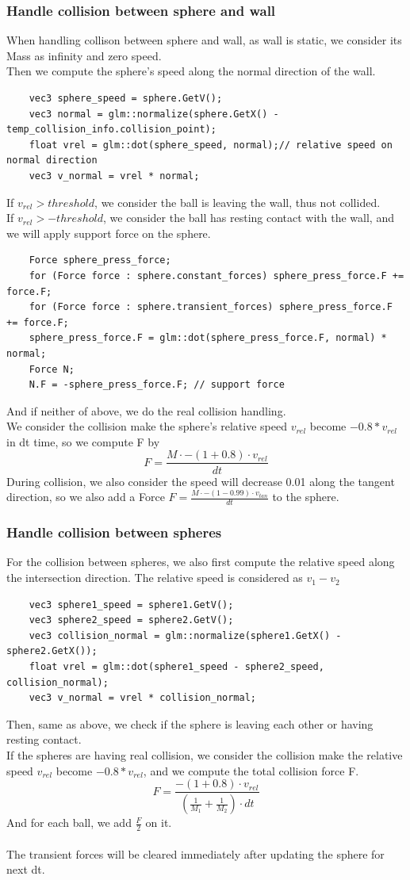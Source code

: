 \documentclass[acmtog]{acmart}
\begin{document}
\subsubsection{Handle collision between sphere and wall}
\quad When handling collison between sphere and wall, as wall is static, we consider its Mass as infinity and zero speed.\\
Then we compute the sphere's speed along the normal direction of the wall.
\begin{lstlisting}
	vec3 sphere_speed = sphere.GetV();
	vec3 normal = glm::normalize(sphere.GetX() - temp_collision_info.collision_point);
	float vrel = glm::dot(sphere_speed, normal);// relative speed on normal direction
	vec3 v_normal = vrel * normal;
\end{lstlisting}
If $v_{rel} > threshold$, we consider the ball is leaving the wall, thus not collided.\\
If $v_{rel} > -threshold$, we consider the ball has resting contact with the wall, and we will apply support force on the sphere.
\begin{lstlisting}
	Force sphere_press_force;
	for (Force force : sphere.constant_forces) sphere_press_force.F += force.F;
	for (Force force : sphere.transient_forces) sphere_press_force.F += force.F;
	sphere_press_force.F = glm::dot(sphere_press_force.F, normal) * normal;
	Force N;
	N.F = -sphere_press_force.F; // support force
\end{lstlisting}
And if neither of above, we do the real collision handling.\\
We consider the collision make the sphere's relative speed $v_{rel}$ become $-0.8 * v_{rel}$ in dt time, so we compute F by
$$F = \frac{M\cdot-(1+0.8)\cdot v_{rel}}{dt}$$
During collision, we also consider the speed will decrease 0.01 along the tangent direction, so we also add a Force $F = \frac{M\cdot-(1 - 0.99)\cdot v_{tan}}{dt}$
to the sphere.
\subsubsection{Handle collision between spheres}
\quad For the collision between spheres, we also first compute the relative speed along the intersection direction.
The relative speed is considered as $v_1 - v_2$
\begin{lstlisting}
	vec3 sphere1_speed = sphere1.GetV();
	vec3 sphere2_speed = sphere2.GetV();
	vec3 collision_normal = glm::normalize(sphere1.GetX() - sphere2.GetX());
	float vrel = glm::dot(sphere1_speed - sphere2_speed, collision_normal);
	vec3 v_normal = vrel * collision_normal;
\end{lstlisting}
Then, same as above, we check if the sphere is leaving each other or having resting contact.\\
If the spheres are having real collision, we consider the collision make the relative speed $v_{rel}$ become $-0.8 * v_{rel}$, and we compute the
total collision force F.
$$F = \frac{-(1+0.8)\cdot v_{rel}}{(\frac{1}{M_1} + \frac{1}{M_2})\cdot dt}$$
And for each ball, we add $\frac{F}{2}$ on it.\\
\\ The transient forces will be cleared immediately after updating the sphere for next dt.
\end{document}
